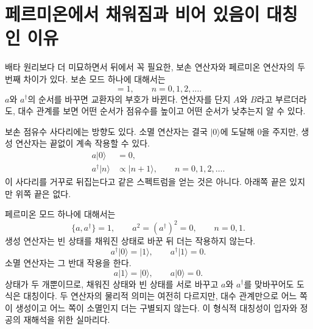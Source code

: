\section{페르미온에서 채워짐과 비어 있음이 대칭인 이유}

배타 원리보다 더 미묘하면서 뒤에서 꼭 필요한, 보손 연산자와 페르미온 연산자의 두 번째 차이가 있다. 보손 모드 하나에 대해서는
\begin{equation}
[a,a^\dagger]=1,
\qquad
n=0,1,2,\ldots.
\end{equation}
\(a\)와 \(a^\dagger\)의 순서를 바꾸면 교환자의 부호가 바뀐다. 연산자를 단지 \(A\)와 \(B\)라고 부르더라도, 대수 관계를 보면 어떤 순서가 점유수를 높이고 어떤 순서가 낮추는지 알 수 있다.

보손 점유수 사다리에는 방향도 있다. 소멸 연산자는 결국 \(\lvert0\rangle\)에 도달해 0을 주지만, 생성 연산자는 끝없이 계속 작용할 수 있다.
\begin{align}
a\lvert0\rangle&=0,\\
a^\dagger\lvert n\rangle&\propto\lvert n+1\rangle,
\qquad n=0,1,2,\ldots.
\end{align}
이 사다리를 거꾸로 뒤집는다고 같은 스펙트럼을 얻는 것은 아니다. 아래쪽 끝은 있지만 위쪽 끝은 없다.

페르미온 모드 하나에 대해서는
\begin{equation}
\{a,a^\dagger\}=1,
\qquad
a^2=(a^\dagger)^2=0,
\qquad
n=0,1.
\label{eq:l10-fermion-mode}
\end{equation}
생성 연산자는 빈 상태를 채워진 상태로 바꾼 뒤 더는 작용하지 않는다.
\begin{equation}
a^\dagger\lvert0\rangle=\lvert1\rangle,
\qquad
a^\dagger\lvert1\rangle=0.
\end{equation}
소멸 연산자는 그 반대 작용을 한다.
\begin{equation}
a\lvert1\rangle=\lvert0\rangle,
\qquad
a\lvert0\rangle=0.
\end{equation}
상태가 두 개뿐이므로, 채워진 상태와 빈 상태를 서로 바꾸고 \(a\)와 \(a^\dagger\)를 맞바꾸어도 도식은 대칭이다. 두 연산자의 물리적 의미는 여전히 다르지만, 대수 관계만으로 어느 쪽이 생성이고 어느 쪽이 소멸인지 더는 구별되지 않는다. 이 형식적 대칭성이 입자와 정공의 재해석을 위한 실마리다.

\begin{classroomqa}
\end{classroomqa}

